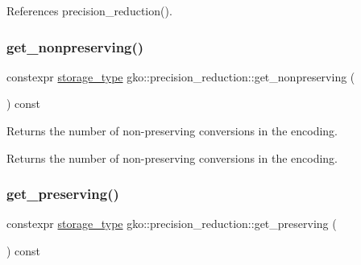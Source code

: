 References precision\+\_\+reduction().

\mbox{\label{classgko_1_1precision__reduction_a909a01025fd490d4658abd7c5791685d}} 
\subsubsection{\texorpdfstring{get\+\_\+nonpreserving()}{get\_nonpreserving()}}
{\footnotesize\ttfamily constexpr \hyperlink{classgko_1_1precision__reduction_a2a1a94a27fa69b4cc321136b56e7b7d9}{storage\+\_\+type} gko\+::precision\+\_\+reduction\+::get\+\_\+nonpreserving (\begin{DoxyParamCaption}{ }\end{DoxyParamCaption}) const\hspace{0.3cm}{\ttfamily [noexcept]}}



Returns the number of non-\/preserving conversions in the encoding. 

\begin{DoxyReturn}{Returns}
the number of non-\/preserving conversions in the encoding. 
\end{DoxyReturn}
\mbox{\label{classgko_1_1precision__reduction_ad709bd9bdd9b4ec27f75fc213aef51df}} 
\subsubsection{\texorpdfstring{get\+\_\+preserving()}{get\_preserving()}}
{\footnotesize\ttfamily constexpr \hyperlink{classgko_1_1precision__reduction_a2a1a94a27fa69b4cc321136b56e7b7d9}{storage\+\_\+type} gko\+::precision\+\_\+reduction\+::get\+\_\+preserving (\begin{DoxyParamCaption}{ }\end{DoxyParamCaption}) const\hspace{0.3cm}{\ttfamily [noexcept]}}



